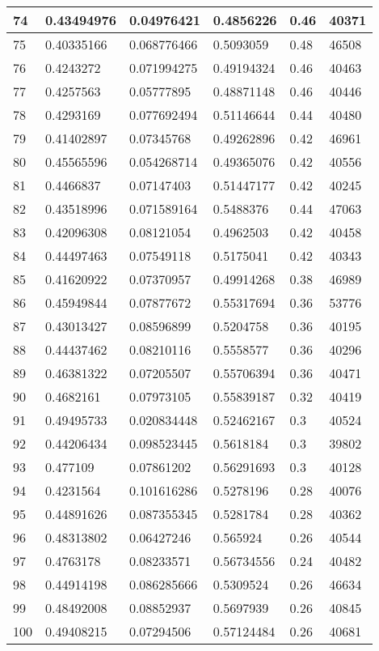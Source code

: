 \begin{longtable}{|l|l|l|l|l|l|}
74 & 0.43494976 & 0.04976421 & 0.4856226 & 0.46 & 40371 \\ \hline 
75 & 0.40335166 & 0.068776466 & 0.5093059 & 0.48 & 46508 \\ \hline 
76 & 0.4243272 & 0.071994275 & 0.49194324 & 0.46 & 40463 \\ \hline 
77 & 0.4257563 & 0.05777895 & 0.48871148 & 0.46 & 40446 \\ \hline 
78 & 0.4293169 & 0.077692494 & 0.51146644 & 0.44 & 40480 \\ \hline 
79 & 0.41402897 & 0.07345768 & 0.49262896 & 0.42 & 46961 \\ \hline 
80 & 0.45565596 & 0.054268714 & 0.49365076 & 0.42 & 40556 \\ \hline 
81 & 0.4466837 & 0.07147403 & 0.51447177 & 0.42 & 40245 \\ \hline 
82 & 0.43518996 & 0.071589164 & 0.5488376 & 0.44 & 47063 \\ \hline 
83 & 0.42096308 & 0.08121054 & 0.4962503 & 0.42 & 40458 \\ \hline 
84 & 0.44497463 & 0.07549118 & 0.5175041 & 0.42 & 40343 \\ \hline 
85 & 0.41620922 & 0.07370957 & 0.49914268 & 0.38 & 46989 \\ \hline 
86 & 0.45949844 & 0.07877672 & 0.55317694 & 0.36 & 53776 \\ \hline 
87 & 0.43013427 & 0.08596899 & 0.5204758 & 0.36 & 40195 \\ \hline 
88 & 0.44437462 & 0.08210116 & 0.5558577 & 0.36 & 40296 \\ \hline 
89 & 0.46381322 & 0.07205507 & 0.55706394 & 0.36 & 40471 \\ \hline 
90 & 0.4682161 & 0.07973105 & 0.55839187 & 0.32 & 40419 \\ \hline 
91 & 0.49495733 & 0.020834448 & 0.52462167 & 0.3 & 40524 \\ \hline 
92 & 0.44206434 & 0.098523445 & 0.5618184 & 0.3 & 39802 \\ \hline 
93 & 0.477109 & 0.07861202 & 0.56291693 & 0.3 & 40128 \\ \hline 
94 & 0.4231564 & 0.101616286 & 0.5278196 & 0.28 & 40076 \\ \hline 
95 & 0.44891626 & 0.087355345 & 0.5281784 & 0.28 & 40362 \\ \hline 
96 & 0.48313802 & 0.06427246 & 0.565924 & 0.26 & 40544 \\ \hline 
97 & 0.4763178 & 0.08233571 & 0.56734556 & 0.24 & 40482 \\ \hline 
98 & 0.44914198 & 0.086285666 & 0.5309524 & 0.26 & 46634 \\ \hline 
99 & 0.48492008 & 0.08852937 & 0.5697939 & 0.26 & 40845 \\ \hline 
100 & 0.49408215 & 0.07294506 & 0.57124484 & 0.26 & 40681 \\ \hline 
\end{longtable}